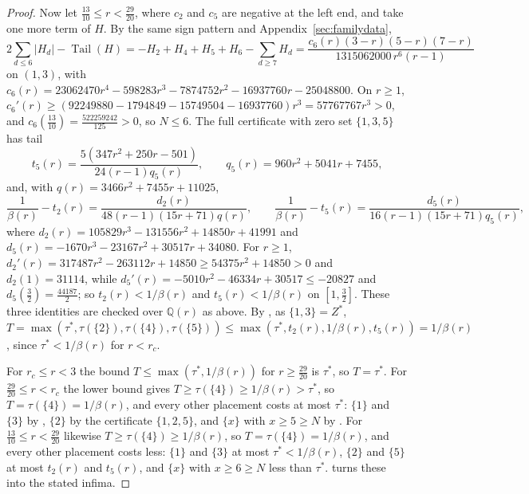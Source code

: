 \documentclass[11pt]{article}
\DeclareMathOperator{\Tail}{Tail}
\begin{document}
\begin{proof}
Now let $\tfrac{13}{10}\le r<\tfrac{29}{20}$, where $c_2$ and $c_5$ are
negative at the left end, and take one more term of $H$.  By the same sign
pattern and Appendix~\ref{sec:familydata},
\[
  2\sum_{d\le6}|H_d|-\Tail(H)=-H_2+H_4+H_5+H_6-\sum_{d\ge7}H_d
  =\frac{c_6(r)(3-r)(5-r)(7-r)}{1315062000\,r^6(r-1)}
\]
on $(1,3)$, with
$c_6(r)=23062470r^4-598283r^3-7874752r^2-16937760r-25048800$.  On $r\ge1$,
$c_6'(r)\ge(92249880-1794849-15749504-16937760)r^3=57767767r^3>0$, and
$c_6(\tfrac{13}{10})=\tfrac{522259242}{125}>0$, so $N\le6$.  The full
certificate with zero set $\{1,3,5\}$ has tail
\[
  t_5(r)=\frac{5(347r^2+250r-501)}{24(r-1)q_5(r)},\qquad
  q_5(r)=960r^2+5041r+7455,
\]
and, with $q(r)=3466r^2+7455r+11025$,
\[
  \frac1{\beta(r)}-t_2(r)=\frac{d_2(r)}{48(r-1)(15r+71)q(r)},\qquad
  \frac1{\beta(r)}-t_5(r)=\frac{d_5(r)}{16(r-1)(15r+71)q_5(r)},
\]
where $d_2(r)=105829r^3-131556r^2+14850r+41991$ and
$d_5(r)=-1670r^3-23167r^2+30517r+34080$.  For $r\ge1$,
$d_2'(r)=317487r^2-263112r+14850\ge54375r^2+14850>0$ and $d_2(1)=31114$, while
$d_5'(r)=-5010r^2-46334r+30517\le-20827$ and
$d_5(\tfrac32)=\tfrac{44187}2$; so $t_2(r)<1/\beta(r)$ and
$t_5(r)<1/\beta(r)$ on $[1,\tfrac32]$.  These three identities are checked
over $\mathbb Q(r)$ as above.  By
\cite[Theorem~5.3]{coefficient-mass-attainment}, as $\{1,3\}=Z^*$,
$T=\max(\tau^*,\tau(\{2\}),\tau(\{4\}),\tau(\{5\}))
\le\max(\tau^*,t_2(r),1/\beta(r),t_5(r))=1/\beta(r)$, since $\tau^*<1/\beta(r)$
for $r<r_c$.

For $r_c\le r<3$ the bound $T\le\max(\tau^*,1/\beta(r))$ for
$r\ge\tfrac{29}{20}$ is $\tau^*$, so $T=\tau^*$.  For
$\tfrac{29}{20}\le r<r_c$ the lower bound gives $T\ge\tau(\{4\})\ge1/\beta(r)>\tau^*$,
so $T=\tau(\{4\})=1/\beta(r)$, and every other placement costs at most
$\tau^*$: $\{1\}$ and $\{3\}$ by \cite[Theorem~5.3(a)]{coefficient-mass-attainment}, $\{2\}$ by
the certificate $\{1,2,5\}$, and $\{x\}$ with $x\ge5\ge N$ by
\cite[Theorem~5.3(c)]{coefficient-mass-attainment}.  For $\tfrac{13}{10}\le r<\tfrac{29}{20}$
likewise $T\ge\tau(\{4\})\ge1/\beta(r)$, so $T=\tau(\{4\})=1/\beta(r)$, and
every other placement costs less: $\{1\}$ and $\{3\}$ at most
$\tau^*<1/\beta(r)$, $\{2\}$ and $\{5\}$ at most $t_2(r)$ and $t_5(r)$, and
$\{x\}$ with $x\ge6\ge N$ less than $\tau^*$.  \cite[Theorem~3.1]{coefficient-mass-attainment} turns
these into the stated infima.
\end{proof}
\end{document}
